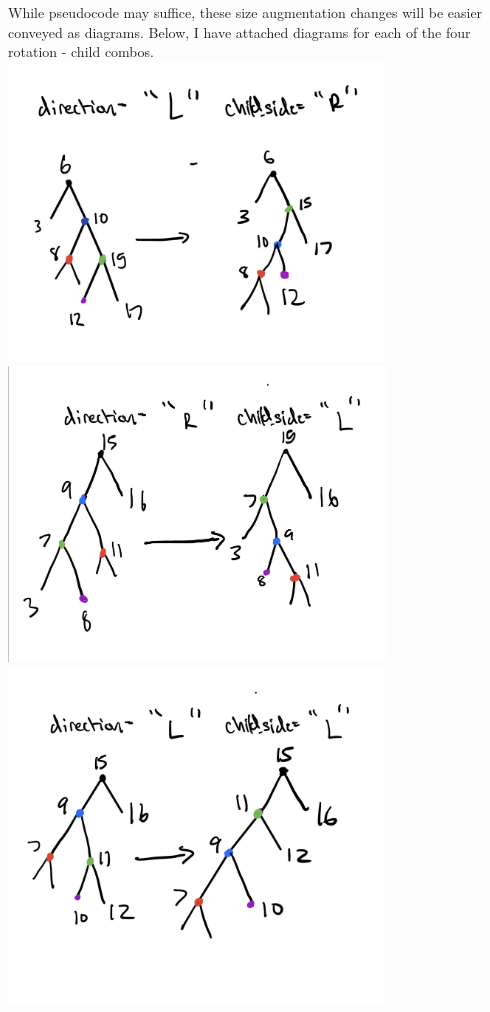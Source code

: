 \documentclass[11pt]{article}
\begin{document}
\begin{enumerate}
\begin{enumerate}
\begin{enumerate}
            While pseudocode may suffice, these size augmentation changes will be easier conveyed as diagrams. Below, I have attached diagrams for each of the four rotation - child combos. \\
            
            \includegraphics[width=0.75\textwidth]{./IMG_0001.jpg}\\
            \includegraphics[width=0.75\textwidth]{./IMG_0002.jpg}\\
            \includegraphics[width=0.75\textwidth]{./IMG_0003.jpg}\\

\end{enumerate}
\end{enumerate}
\end{enumerate}
\end{document}
